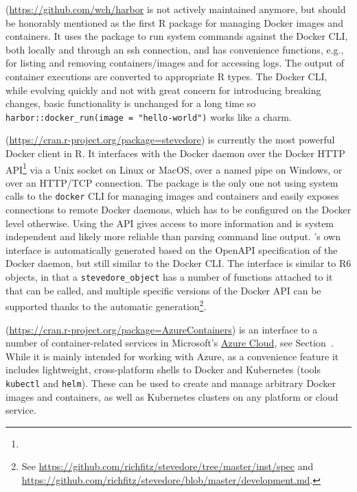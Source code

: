 \textbf{} (\url{https://github.com/wch/harbor} is not
actively maintained anymore, but should be honorably mentioned as the
first R package for managing Docker images and containers. It uses the
 package to run system commands against the Docker CLI, both
locally and through an ssh connection, and has convenience functions,
e.g., for listing and removing containers/images and for accessing logs.
The output of container executions are converted to appropriate R types.
The Docker CLI, while evolving quickly and not with great concern for
introducing breaking changes, basic functionality is unchanged for a
long time so \texttt{harbor::docker\_run(image\ =\ "hello-world")} works
like a charm.

\textbf{}
(\url{https://cran.r-project.org/package=stevedore}) is currently the
most powerful Docker client in R. It interfaces with the Docker daemon
over the Docker HTTP API\footnote{} via a Unix socket on Linux or MacOS,
over a named pipe on Windows, or over an HTTP/TCP connection. The
package is the only one not using system calls to the \texttt{docker}
CLI for managing images and containers and easily exposes connections to
remote Docker daemons, which has to be configured on the Docker level
otherwise. Using the API gives access to more information and is system
independent and likely more reliable than parsing command line output.
's own interface is automatically generated based on the
OpenAPI specification of the Docker daemon, but still similar to the
Docker CLI. The interface is similar to R6 objects, in that a
\texttt{stevedore\_object} has a number of functions attached to it that
can be called, and multiple specific versions of the Docker API can be
supported thanks to the automatic
generation\footnote{See \href{https://github.com/richfitz/stevedore/tree/master/inst/spec}{https://github.com/richfitz/stevedore/tree/master/inst/spec} and \href{https://github.com/richfitz/stevedore/blob/master/development.md}{https://github.com/richfitz/stevedore/blob/master/development.md}.}.

\textbf{}
(\url{https://cran.r-project.org/package=AzureContainers}) is an
interface to a number of container-related services in Microsoft's
\href{https://azure.microsoft.com/}{Azure Cloud}, see
Section~. While it is mainly intended for
working with Azure, as a convenience feature it includes lightweight,
cross-platform shells to Docker and Kubernetes (tools \texttt{kubectl}
and \texttt{helm}). These can be used to create and manage arbitrary
Docker images and containers, as well as Kubernetes clusters on any
platform or cloud service.

